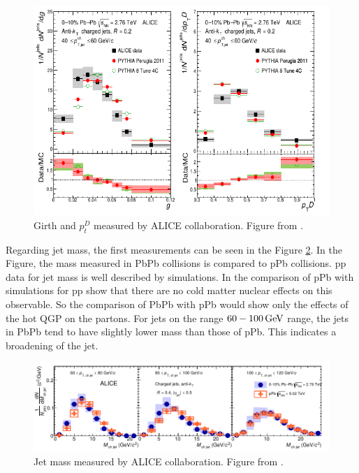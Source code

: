 \begin{figure}
\includegraphics[width=1.0\textwidth]{images/exp_girth_ptd.png}
\caption[Experimental Girth and $p_t^{D}$]{Girth and $p_t^D$ measured by ALICE collaboration. Figure from \cite{alice_collaboration_medium_2018}.}
\label{exp_girth_ptd}
\end{figure}


Regarding jet mass, the first measurements can be seen in the Figure \ref{exp_jet_mass}. In the Figure, the mass measured in PbPb collisions is compared to pPb collisions. pp data for jet mass is well described by simulations. In \cite{alice_collaboration_first_2018} the comparison of pPb with simulations for pp show that there are no cold matter nuclear effects on this observable. So the comparison of PbPb with pPb would show only the effects of the hot QGP on the partons. For jets on the range $60-100 \, {\rm GeV}$ range, the jets in PbPb tend to have slightly lower mass than those of pPb. This indicates a broadening of the jet.

\begin{figure}
\includegraphics[width=1.0\textwidth]{images/exp_jet_mass.png}
\caption[Experimental Jet Mass]{Jet mass measured by ALICE collaboration. Figure from \cite{alice_collaboration_first_2018}.}
\label{exp_jet_mass}
\end{figure}


